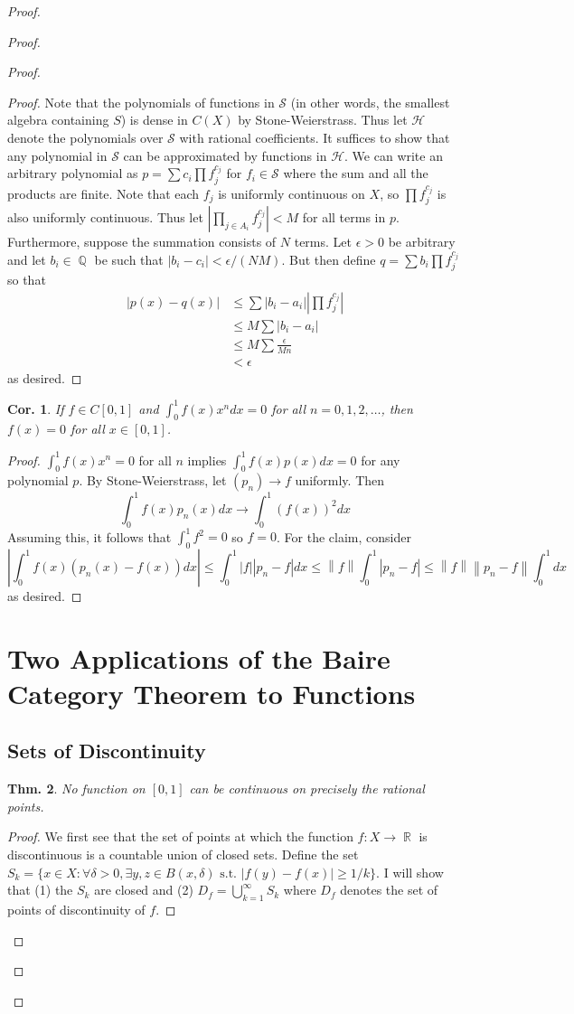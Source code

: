 \documentclass[12pt, a4paper]{book}
\DeclareMathOperator{\Q}{\mathbb{Q}}
\DeclareMathOperator{\R}{\mathbb{R}}
\newcommand{\norm}[1]{\left\lVert#1\right\rVert} %
\newtheorem{theorem}{Thm.}[section]
\newtheorem{corollary}[theorem]{Cor.}
\theoremstyle{nonumberplain}
\newtheorem{proof}{Proof}
\begin{document}
\begin{proof}
\begin{proof}
\begin{proof}
\begin{proof}
    Note that the polynomials of functions in $\mathcal{S}$ (in other words, the smallest algebra containing $S$) is dense in $C(X)$ by Stone-Weierstrass.
    Thus let $\mathcal{H}$ denote the polynomials over $\mathcal{S}$ with rational coefficients.
    It suffices to show that any polynomial in $\mathcal{S}$ can be approximated by functions in $\mathcal{H}$.
    We can write an arbitrary polynomial as $p=\sum c_i \prod f_j^{c_j}$ for $f_i\in\mathcal{S}$ where the sum and all the products are finite.
    Note that each $f_j$ is uniformly continuous on $X$, so $\prod f_j^{c_j}$ is also uniformly continuous.
    Thus let $\left\lvert\prod_{j\in A_i} f_j^{c_j}\right\rvert<M$ for all terms in $p$.
    Furthermore, suppose the summation consists of $N$ terms.
    Let $\epsilon>0$ be arbitrary and let $b_i\in\Q$ be such that $|b_i-c_i|<\epsilon/(NM)$.
    But then define $q=\sum b_i\prod f_j^{c_j}$ so that
    \begin{align*}
        |p(x)-q(x)|&\leq\sum |b_i-a_i|\left\lvert\prod f_j^{c_j}\right\rvert\\
                   &\leq M\sum|b_i-a_i|\\
                   &\leq M\sum \frac{\epsilon}{Mn}\\
                   &<\epsilon
    \end{align*}
    as desired.
\end{proof}
\begin{corollary}
    If $f\in C[0,1]$ and $\int_0^1 f(x)x^n dx = 0$ for all $n=0,1,2,\ldots$, then $f(x)=0$ for all $x\in[0,1]$.
\end{corollary}
\begin{proof}
    $\int_0^1 f(x)x^n=0$ for all $n$ implies $\int_0^1 f(x)p(x)dx=0$ for any polynomial $p$.
    By Stone-Weierstrass, let $(p_n)\to f$ uniformly.
    Then
    \[\int_0^1f(x)p_n(x)dx\to\int_0^1 (f(x))^2dx\]
    Assuming this, it follows that $\int_0^1 f^2=0$ so $f=0$.
    For the claim, consider
    \[|\int_0^1 f(x)(p_n(x)-f(x))dx|\leq\int_0^1|f||p_n-f|dx\leq\norm{f}\int_0^1|p_n-f|\leq\norm{f}\norm{p_n-f}\int_0^1 dx\]
    as desired.
\end{proof}
\section{Two Applications of the Baire Category Theorem to Functions}
\subsection{Sets of Discontinuity}
\begin{theorem}
    No function on $[0,1]$ can be continuous on precisely the rational points.
\end{theorem}
\begin{proof}
    We first see that the set of points at which the function $f:X\to\R$ is discontinuous is a countable union of closed sets.
    Define the set $S_k=\{x\in X:\forall\delta>0,\exists y,z\in B(x,\delta)\text{ s.t. }|f(y)-f(x)|\geq 1/k\}$.
    I will show that (1) the $S_k$ are closed and (2) $D_f=\bigcup_{k=1}^\infty S_k$ where $D_f$ denotes the set of points of discontinuity of $f$.


\end{proof}
\end{proof}
\end{proof}
\end{proof}
\end{document}
